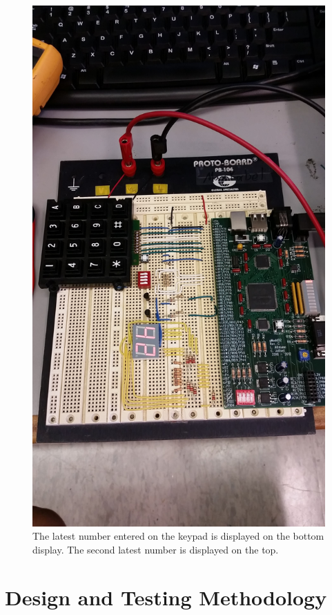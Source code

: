 \documentclass[11pt]{article}
\begin{document}
\begin{figure}[h!]
\centering
\includegraphics[scale=0.11]{board.jpg}
\caption{The latest number entered on the keypad is displayed on the bottom display. The second latest number is displayed on the top.}
\label{fig:board}
\end{figure} 


\section{Design and Testing Methodology}
\end{document}

